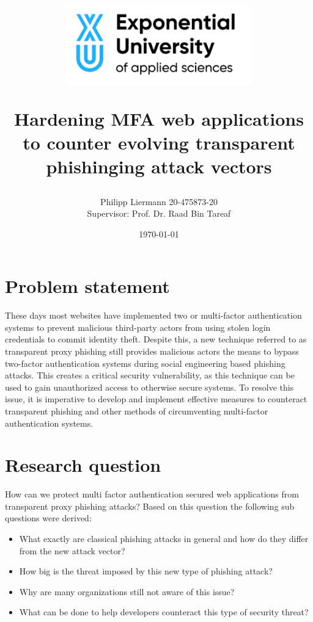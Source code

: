 \documentclass[12pt]{report}
\begin{document}
\author{Philipp Liermann 20-475873-20\\Supervisor: Prof. Dr. Raad Bin Tareaf}
\date{\today}


\title{
\begin{center}
	\includegraphics[width=8cm]{./images/logo.png}
\end{center}
\vspace{2cm}
Hardening MFA web applications to counter evolving transparent phishinging attack
vectors
\vspace{2cm}
\large }

\maketitle

\newpage
\tableofcontents

\newpage
\section{Problem statement}
These days most websites have implemented two or multi-factor authentication systems
to prevent malicious third-party actors from using stolen login credentials to
commit identity theft. Despite this, a new technique referred to as transparent
proxy phishing still provides malicious actors the means to bypass two-factor authentication
systems during social engineering based phishing attacks. This creates a
critical security vulnerability, as this technique can be used to gain unauthorized
access to otherwise secure systems. To resolve this issue, it is imperative to
develop and implement effective measures to counteract transparent phishing and
other methods of circumventing multi-factor authentication systems.

\section{Research question}
How can we protect multi factor authentication secured web applications from transparent
proxy phishing attacks? Based on this question the following sub questions
were derived:
\begin{itemize}
	\item What exactly are classical phishing attacks in general and how do they
	      differ from the new attack vector?

	\item How big is the threat imposed by this new type of phishing attack?

	\item Why are many organizations still not aware of this issue?

	\item What can be done to help developers counteract this type of security threat?
\end{itemize}
\end{document}
